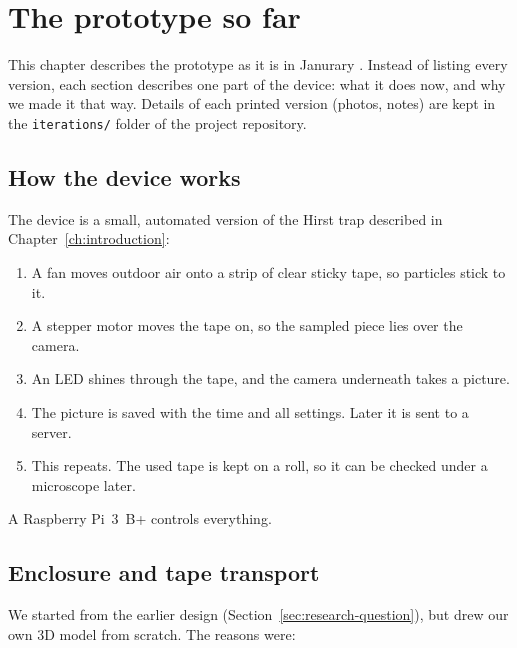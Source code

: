 \chapter{The prototype so far}\label{ch:prototype}

This chapter describes the prototype as it is in Janurary . Instead of listing
every version, each section describes one part of the device: what it does now, and why we
made it that way. Details of each printed version (photos, notes) are kept in the
\texttt{iterations/} folder of the project repository.

\section{How the device works}\label{sec:how-it-works}

The device is a small, automated version of the Hirst trap described in
Chapter~\ref{ch:introduction}:

\begin{enumerate}
  \item A fan moves outdoor air onto a strip of clear sticky tape, so particles stick to it.
  \item A stepper motor moves the tape on, so the sampled piece lies over the camera.
  \item An LED shines through the tape, and the camera underneath takes a picture.
  \item The picture is saved with the time and all settings. Later it is sent to a server.
  \item This repeats. The used tape is kept on a roll, so it can be checked under a microscope later.
\end{enumerate}

A Raspberry Pi~3~B+ controls everything. 

\section{Enclosure and tape transport}\label{sec:enclosure}

We started from the earlier design (Section~\ref{sec:research-question}), but drew our own 3D
model from scratch. The reasons were:

